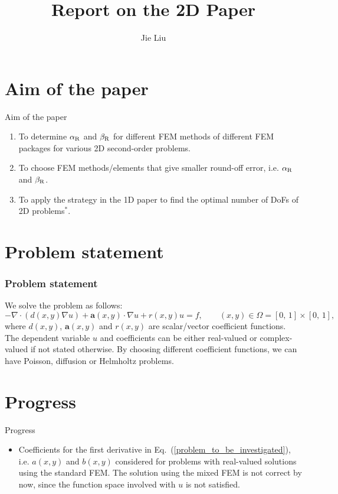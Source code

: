 \documentclass{beamer}
\title[]{Report on the 2D Paper}
\institute[]{Delft University of Technology, the Netherlands}
\author{Jie Liu}
\begin{document}
{
\frame{\titlepage}
}


\section{Aim of the paper}
\begin{frame}{Aim of the paper}
\vspace{-8em}
\begin{enumerate}
 \item To determine $\alpha_{\rm R}$ and $\beta_{\rm R}$ for different FEM methods of different FEM packages for various 2D second-order problems.
 \item To choose FEM methods/elements that give smaller round-off error, i.e. $\alpha_{\rm R}$ and $\beta_{\rm R}$.
 \item To apply the strategy in the 1D paper to find the optimal number of DoFs of 2D problems$^{*}$.
\end{enumerate}
\end{frame}

\section{Problem statement}
\begin{frame}
\frametitle{Problem statement}
\vspace{-8em}
We solve the problem as follows:
\scriptsize
\begin{equation}
 - \nabla \cdot (d(x,y) \nabla u) + \mathbf{a}(x,y) \cdot \nabla u + r(x,y) u = f,\qquad (x,y) \in \Omega = [0,\,1] \times [0,\,1],
 \label{problem_to_be_investigated}
\end{equation}
\normalsize
where $d(x,y)$, $\mathbf{a}(x,y)$ and $r(x,y)$ are scalar/vector coefficient functions. The dependent variable $u$ and coefficients can be either real-valued or complex-valued if not stated otherwise. By choosing different coefficient functions, we can have Poisson, diffusion or Helmholtz problems.
\end{frame}


\section{Progress}
\begin{frame}{Progress}
\vspace{-10.5em}
\begin{itemize}
 \item Coefficients for the first derivative in Eq.~(\ref{problem_to_be_investigated}), i.e. $a(x,y)$ and $b(x,y)$ considered for problems with real-valued solutions using the standard FEM. The solution using the mixed FEM is not correct by now, since the function space involved with $u$ is not satisfied. 
\end{itemize}
\end{frame}
\end{document}
